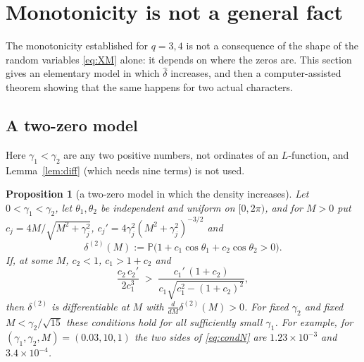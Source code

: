 \documentclass[11pt]{amsart}
\newtheorem{proposition}[theorem]{Proposition}
\theoremstyle{definition}
\numberwithin{equation}{section}
\newcommand{\PP}{\mathbb P}
\newcommand{\hd}{\widehat\delta}
\begin{document}
\section{Monotonicity is not a general fact}\label{sec:nonmono}

The monotonicity established for $q=3,4$ is not a consequence of the
shape of the random variables \eqref{eq:XM} alone: it depends on
where the zeros are. This section gives an elementary model in which
$\hd$ increases, and then a computer-assisted theorem showing that the
same happens for two actual characters.

\subsection{A two-zero model}

Here $\gamma_1<\gamma_2$ are any two positive numbers, not ordinates
of an $L$-function, and Lemma~\ref{lem:diff} (which needs nine terms)
is not used.

\begin{proposition}[a two-zero model in which the density increases]
\label{prop:twozero}
Let $0<\gamma_1<\gamma_2$, let $\theta_1,\theta_2$ be independent and
uniform on $[0,2\pi)$, and for $M>0$ put
$c_j=4M/\sqrt{M^2+\gamma_j^2}$,
$c_j'=4\gamma_j^2(M^2+\gamma_j^2)^{-3/2}$ and
\[
\delta^{(2)}(M):=\PP\bigl(1+c_1\cos\theta_1+c_2\cos\theta_2>0\bigr).
\]
If, at some $M$, $c_2<1$, $c_1>1+c_2$ and
\begin{equation}\label{eq:condN}
\frac{c_2\,c_2'}{2c_1^3}\;>\;
\frac{c_1'\,(1+c_2)}{c_1\sqrt{c_1^2-(1+c_2)^2}} ,
\end{equation}
then $\delta^{(2)}$ is differentiable at $M$ with
$\frac{d}{dM}\delta^{(2)}(M)>0$. For fixed $\gamma_2$ and fixed
$M<\gamma_2/\sqrt{15}$ these conditions hold for all sufficiently
small $\gamma_1$. For example, for
$(\gamma_1,\gamma_2,M)=(0.03,10,1)$ the two sides of \eqref{eq:condN}
are $1.23\times10^{-3}$ and $3.4\times10^{-4}$.
\end{proposition}
\end{document}
